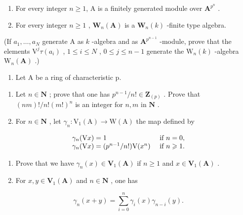\begin{enumerate}
\def\labelenumi{\alph{enumi})}
\item
  For every integer \(n \geqslant 1\), A is a finitely generated module over \(\mathbf{A}^{p^n}\) .
\item
  For every integer \(n \geqslant 1\) , \(\mathbf{W}_n(\mathbf{A})\) is a \(\mathbf{W}_n(k)\) -finite type algebra.
\end{enumerate}

(If \(a_{1},\ldots,a_{N}\) generate A as \(k\) -algebra and as \(\mathbf{A}^{p^{n-1}}\) -module, prove that the elements \(\mathrm{V}^j\tau(a_i)\) , \(1\leqslant i\leqslant N\) , \(0\leqslant j\leqslant n-1\) generate the \(\mathrm{W}_{n}(k)\) -algebra \(\mathrm{W}_{n}(\mathbf{A})\) .)

\begin{enumerate}
\def\labelenumi{\arabic{enumi})}
\setcounter{enumi}{10}
\tightlist
\item
  Let A be a ring of characteristic p.
\end{enumerate}

\begin{enumerate}
\def\labelenumi{\alph{enumi})}
\item
  Let \(n \in \mathbf{N}\) ; prove that one has \(p^{n-1}/n! \in \mathbf{Z}_{(p)}\) . Prove that \((nm)!/n!(m!)^n\) is an integer for \(n, m\) in \(\mathbf{N}\) .
\item
  For \(n \in \mathbf{N}\) , let \(\gamma_{n}: \mathrm{V}_{1}(\mathrm{A}) \to \mathrm{W}(\mathrm{A})\) the map defined by
\end{enumerate}

\[
\begin{array}{l l} \gamma_ {n} (\mathrm{V} x) = 1 & \text { if } n = 0, \\ \gamma_ {n} (\mathrm{V} x) = (p ^ {n - 1} / n!) \mathrm{V} (x ^ {n}) & \text { if } n \geqslant 1. \end{array}
\]

\begin{enumerate}
\def\labelenumi{(\roman{enumi})}
\item
  Prove that we have \(\gamma_{n}(x)\in\mathbf{V}_{1}(\mathbf{A})\) if \(n\geqslant 1\) and \(x\in\mathbf{V}_{1}(\mathbf{A})\) .
\item
  For \(x, y \in \mathbf{V}_1(\mathbf{A})\) and \(n \in \mathbf{N}\) , one has
\end{enumerate}

\[
\gamma_ {n} (x + y) = \sum_ {i = 0} ^ {n} \gamma_ {i} (x) \gamma_ {n - i} (y).
\]

